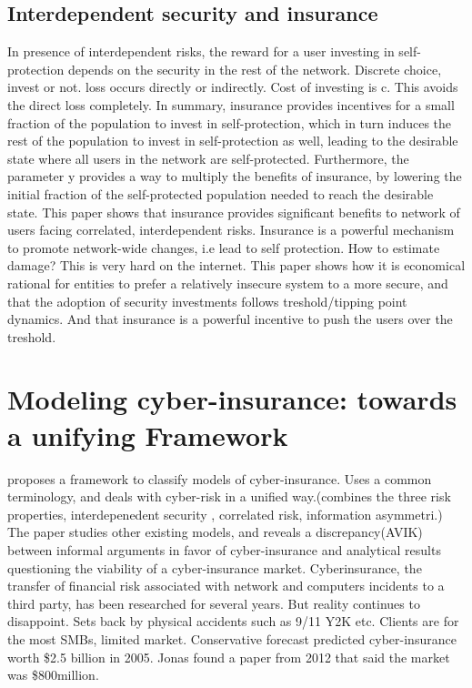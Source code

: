 \subsection{Interdependent security and insurance}
In presence of interdependent risks, the reward for a user investing in self-protection depends on the security in the rest of the network.
Discrete choice, invest or not. loss occurs directly or indirectly. Cost of investing is c. This avoids the direct loss completely. 
In summary, insurance provides incentives for a
small fraction of the population to invest in self-protection, which in turn induces the rest
of the population to invest in self-protection as well, leading to the desirable state where
all users in the network are self-protected. Furthermore, the parameter y provides a way
to multiply the beneﬁts of insurance, by lowering the initial fraction of the self-protected
population needed to reach the desirable state.
This paper shows that insurance provides significant benefits to network of users facing correlated, 
interdependent risks. Insurance is a powerful mechanism to promote network-wide changes, i.e lead to self protection.
How to estimate damage? This is very hard on the internet. 
This paper shows how it is economical rational for entities to prefer a relatively 
insecure system to a more secure, and that the adoption of security investments follows treshold/tipping point dynamics. 
And that insurance is a powerful incentive to push the users over the treshold.

\section{Modeling cyber-insurance: towards a unifying Framework}
proposes a framework to classify models of cyber-insurance. Uses a common terminology, 
and deals with cyber-risk in a unified way.(combines the three risk properties, interdepenedent security
, correlated risk, information asymmetri.)
The paper studies other existing models, and reveals a discrepancy(AVIK) between informal arguments in 
favor of cyber-insurance and analytical results questioning the viability of a cyber-insurance market.
Cyberinsurance, the transfer of financial risk associated with network and computers 
incidents to a third party, has been researched for several years. But reality continues to disappoint. 
Sets back by physical accidents such as 9/11 Y2K etc. Clients are for the most SMBs, limited market. 
Conservative forecast predicted cyber-insurance worth \$2.5 billion in 2005. Jonas found a paper from 2012 that said the market was \$800million.

